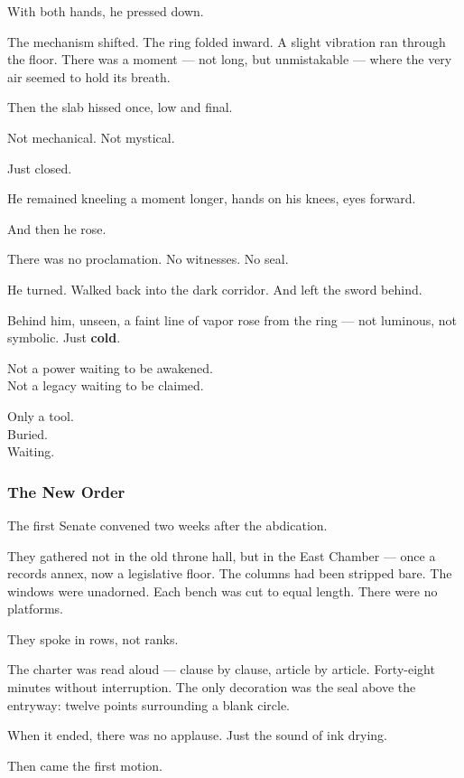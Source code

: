 \documentclass[12pt]{article}
\begin{document}
With both hands, he pressed down.

The mechanism shifted. The ring folded inward. A slight vibration ran through the floor. There was a moment --- not long, but unmistakable --- where the very air seemed to hold its breath.

Then the slab hissed once, low and final.

Not mechanical. Not mystical.

Just closed.

He remained kneeling a moment longer, hands on his knees, eyes forward.

And then he rose.

There was no proclamation. No witnesses. No seal.

He turned. Walked back into the dark corridor. And left the sword behind.

\vspace{1em}

Behind him, unseen, a faint line of vapor rose from the ring --- not luminous, not symbolic. Just \textbf{cold}.

Not a power waiting to be awakened.\\
Not a legacy waiting to be claimed.

Only a tool.\\
Buried.\\
Waiting.

\dotfill

\subsubsection*{The New Order}

The first Senate convened two weeks after the abdication.

They gathered not in the old throne hall, but in the East Chamber --- once a records annex, now a legislative floor. The columns had been stripped bare. The windows were unadorned. Each bench was cut to equal length. There were no platforms.

They spoke in rows, not ranks.

The charter was read aloud --- clause by clause, article by article. Forty-eight minutes without interruption. The only decoration was the seal above the entryway: twelve points surrounding a blank circle.

When it ended, there was no applause. Just the sound of ink drying.

Then came the first motion.
\end{document}
